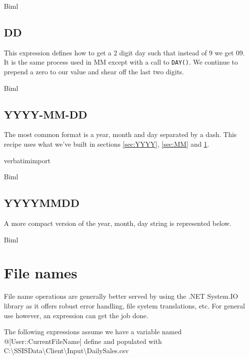 

Biml


\section{DD}
\label{sec:DD}
This expression defines how to get a 2 digit day such that instead of 9 we get 09. It is the same process used in MM except with a call to  \verb|DAY()|. We continue to prepend a zero to our value and shear off the last two digits.



Biml


\section{YYYY-MM-DD}
\label{sec:YYYY-MM-DD}
The most common format is a year, month and day separated by a dash. This recipe uses what we've built in sections \ref{sec:YYYY}, \ref{sec:MM} and \ref{sec:DD}.


verbatimimport 




Biml



\section{YYYYMMDD}
\label{sec:YYYYMMDD}
A more compact version of the year, month, day string is represented below. 




Biml



\chapter{File names}
\label{chap:File names}
File name operations are generally better served by using the .NET System.IO library as it offers robust error handling, file system translations, etc. For general use however, an expression can get the job done.

The following expressions assume we have a variable named @[User::CurrentFileName] define and populated with C:\textbackslash SSISData\textbackslash Client\textbackslash Input\textbackslash DailySales.csv


